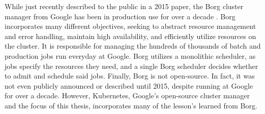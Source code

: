 While just recently described to the public in a 2015 paper, the
Borg cluster manager from Google has been in production use for over a
decade \cite{borg}. Borg incorporates
many different objectives, seeking to abstract resource management and error
handling, maintain high availability, and efficiently utilize resources on the
cluster. It is responsible for managing the hundreds of
thousands of batch and production jobs run everyday at Google.
Borg utilizes a monolithic scheduler, as jobs specify the
resources they need, and a single Borg scheduler decides whether to admit and
schedule said jobs. Finally, Borg is not open-source. In fact, it was not even
publicly announced or described until 2015, despite running at Google for over a
decade. However, Kubernetes, Google's open-source cluster manager and the focus
of this thesis, incorporates many of the lesson's learned from Borg.
